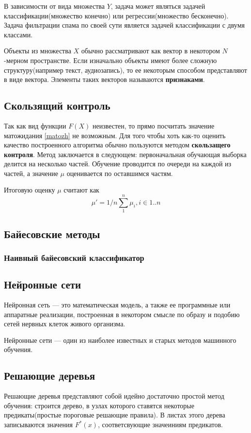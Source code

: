 В зависимости от вида множества $Y$, задача может являться задачей классификации(множество конечно) или регрессии(множество бесконечно).
Задача фильтрации спама по своей сути является задачей классификации с двумя классами.

Объекты из множества $X$ обычно рассматривают как вектор в некотором $N$-мерном пространстве. Если изначально объекты имеют более сложную структуру(например текст, аудиозапись), то ее некоторым способом представляют в виде вектора. Элементы таких векторов называются \textbf{признаками}.

\subsection{Скользящий контроль}
Так как вид функции $F(X)$  неизвестен, то прямо посчитать значение матожидания \ref{matozh} не возможным. Для того чтобы хоть как-то оценить качество построенного алгоритма обычно пользуются методом \textbf{скользащего контроля}. Метод заключается в следующем: первоначальная обучающая выборка делится на несколько частей. Обучение проводится по очереди на каждой из частей, а значение $\mu$ оценивается по оставшимся частям.

Итоговую оценку $\mu$ считают как
\begin{equation}
\mu' = 1/n\sum_1^n{\mu_i}, i \in 1..n
\end{equation}

\subsection{Байесовские методы}
\subsubsection{Наивный байесовский классификатор}
\subsection{Нейронные сети}
Нейронная сеть — это математическая модель, а также ее программные или аппаратные реализации, построенная в некотором смысле по образу и подобию сетей нервных клеток живого организма.

Нейронные сети — один из наиболее известных и старых методов машинного обучения.

\subsection{Решающие деревья}
Решающие деревья представляют собой идейно достаточно простой метод обучения: строится дерево, в узлах которого ставятся некоторые предикаты(простые пороговые решающие правила). В листах этого дерева записываются значения $F^*(x)$, соответсвующие значеиниям предикатов.

